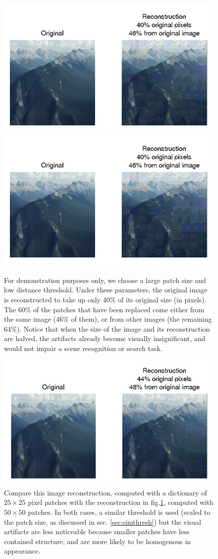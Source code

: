  \begin{figure}
\centering
\includegraphics[width=0.7\linewidth]{Figures/184.png}
\includegraphics[width=0.3\linewidth]{Figures/184.png}
\caption{For demonstration purposes only, we choose a large patch size and low distance threshold. Under these parameters, the original image is reconstructed to take up only $40\%$ of its original size (in pixels). The $60\%$ of the patches that have been replaced come either from the same image ($46\%$ of them), or from other images (the remaining $64\%$). Notice that when the size of the image and its reconstruction are halved, the artifacts already become visually insignificant, and would not impair a scene recognition or search task. }
\label{fig:badrecon}
\end{figure}

 \begin{figure}
\centering
\includegraphics[width=0.7\linewidth]{Figures/184_25.png}
\caption{Compare this image reconstruction, computed with a dictionary of $25\times 25$ pixel patches with the reconstruction in fig.\ref{fig:badrecon}, computed with $50\times 50$ patches. In both cases, a similar threshold is used (scaled to the patch size, as discussed in sec. \ref{sec:simthresh}) but the visual artifacts are less noticeable because smaller patches have less contained structure, and are more likely to be homogenous in appearance.}
\label{fig:patchsize}
\end{figure}


